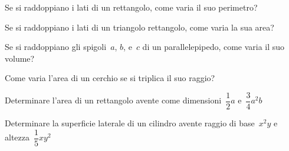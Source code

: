 \begin{htmulticols}{2}
\begin{esercizio}
\label{ese:10.36}
Se si raddoppiano i lati di un rettangolo, come varia il suo
perimetro?
\end{esercizio}

\begin{esercizio}
\label{ese:10.37}
Se si raddoppiano i lati di un triangolo rettangolo, come varia la sua
area?
\end{esercizio}

\begin{esercizio}
\label{ese:10.38}
Se si raddoppiano gli spigoli~\(a\), \(b\), e~\(c\) di un parallelepipedo, 
come varia il suo volume?
\end{esercizio}

\begin{esercizio}
\label{ese:10.39}
Come varia l'area di un cerchio se si triplica il suo raggio?
\end{esercizio}

\begin{esercizio}
\label{ese:10.40}
Determinare l'area di un rettangolo avente come
dimensioni~\(\dfrac{1}{2}a\) e~\(\dfrac{3}{4}a^{2}b\)
\end{esercizio}

\begin{esercizio}
\label{ese:10.41}
Determinare la superficie laterale di un cilindro avente raggio di
base~\(x^{2}y\) e altezza~\(\dfrac{1}{5}{xy}^{2}\)
\end{esercizio}
\end{htmulticols}

